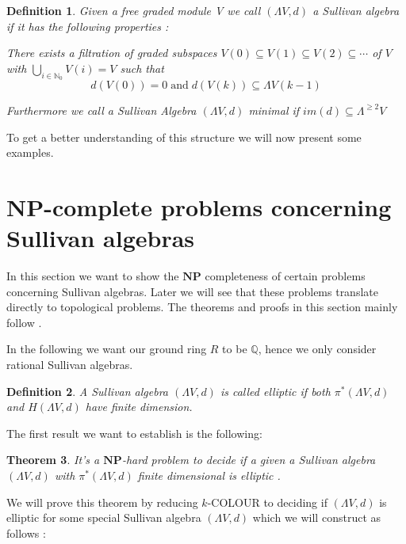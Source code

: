 \documentclass[12pt,a4paper]{scrartcl}
\newtheorem{Theorem}{Theorem}[section]
\newtheorem{Definition}[Theorem]{Definition}
\numberwithin{equation}{section}
\newcommand{\Q}{\mathbb{Q}} %
\newcommand{\N}{\mathbb{N}} %
\newcommand{\NPcomplexity}{\mathbf{NP}}
\begin{document}
\begin{Definition}
 Given a free graded module V we call $(\Lambda V, d)$ a \emph{Sullivan algebra} if it has the following properties :
 
  There exists a filtration of graded subspaces $V(0) \subseteq V(1) \subseteq V(2) \subseteq \cdots $ of $V$
  with $\bigcup_{i \in \N_0} V(i) = V$ such that 
  $$ d(V(0)) = 0 \; \text{and} \; d( V(k)) \subseteq  \Lambda V(k-1) $$
  
 Furthermore we call a Sullivan Algebra $(\Lambda V,d)$ \emph{minimal} if $im(d) \subseteq \Lambda^{\geq 2} V$
\end{Definition}

To get a better understanding of this structure we will now present some examples.


 \section{NP-complete problems concerning Sullivan algebras}
 
 In this section we want to show the %
 $\NPcomplexity$ completeness of certain problems concerning Sullivan algebras. Later we will see that these problems
 translate directly to topological problems. The theorems and proofs in this section mainly follow  \cite{Lechuga2000}.
 
 In the following we want our ground ring $R$ to be  $\Q$, hence we only consider rational Sullivan algebras.
 
 \begin{Definition}
  A Sullivan algebra $(\Lambda V, d)$ is called \emph{elliptic} if both $\pi^*(\Lambda V,d)$ and $H(\Lambda V,d)$ have
  finite dimension.
 \end{Definition}
 
 The first result we want to establish is the following:
 
 \begin{Theorem}
 \label{cohomologyFinTheorem}
  It's a $\NPcomplexity$-hard problem to decide if a given a Sullivan algebra $(\Lambda V,d)$ with $\pi^*(\Lambda V,d)$ finite dimensional 
  is elliptic . %
 \end{Theorem}
 
 
 We will prove this theorem by reducing $k$-COLOUR to deciding if $(\Lambda V,d)$ is elliptic for some special 
 Sullivan algebra $(\Lambda V,d)$ which we will construct as follows : \\
 
\end{document}
